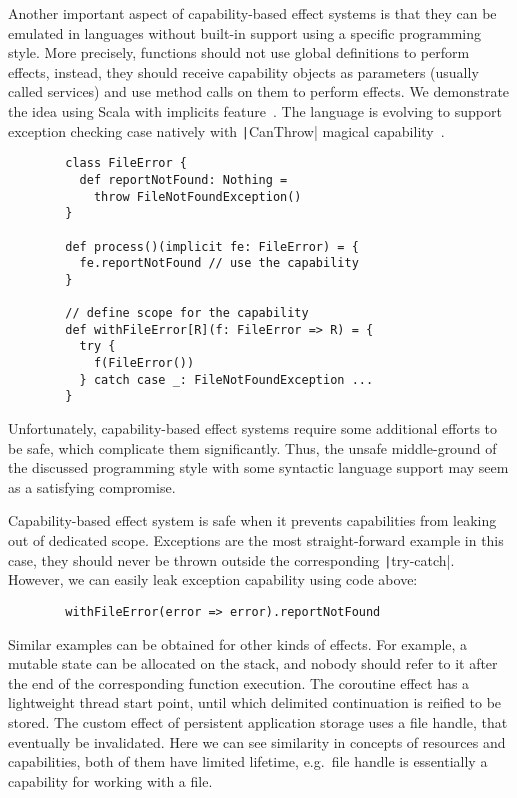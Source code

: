 \documentclass[conference]{IEEEtran}
\begin{document}
    Another important aspect of capability-based effect systems is that they can be emulated in languages without built-in support using a specific programming style.
    More precisely, functions should not use global definitions to perform effects, instead, they should receive capability objects as parameters (usually called services) and use method calls on them to perform effects.
    We demonstrate the idea using Scala with implicits feature~\cite{odersky2004scala}.
    The language is evolving to support exception checking case natively with \texttt|CanThrow| magical capability~\cite{odersky2021safer}.
    \begin{verbatim}
        class FileError {
          def reportNotFound: Nothing =
            throw FileNotFoundException()
        }

        def process()(implicit fe: FileError) = {
          fe.reportNotFound // use the capability
        }

        // define scope for the capability
        def withFileError[R](f: FileError => R) = {
          try {
            f(FileError())
          } catch case _: FileNotFoundException ...
        }
    \end{verbatim}

    Unfortunately, capability-based effect systems require some additional efforts to be safe, which complicate them significantly.
    Thus, the unsafe middle-ground of the discussed programming style with some syntactic language support may seem as a satisfying compromise.

    Capability-based effect system is safe when it prevents capabilities from leaking out of dedicated scope.
    Exceptions are the most straight-forward example in this case, they should never be thrown outside the corresponding \texttt|try-catch|.
    However, we can easily leak exception capability using code above:
    \begin{verbatim}
        withFileError(error => error).reportNotFound
    \end{verbatim}

    Similar examples can be obtained for other kinds of effects.
    For example, a mutable state can be allocated on the stack, and nobody should refer to it after the end of the corresponding function execution.
    The coroutine effect has a lightweight thread start point, until which delimited continuation is reified to be stored.
    The custom effect of persistent application storage uses a file handle, that eventually be invalidated.
    Here we can see similarity in concepts of resources and capabilities, both of them have limited lifetime, e.g.\ file handle is essentially a capability for working with a file.
\end{document}
